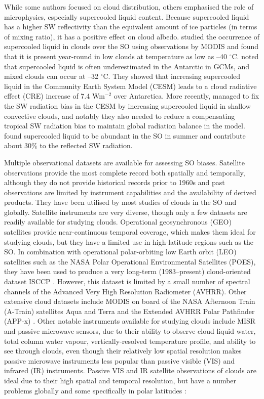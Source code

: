 While some authors focused on cloud distribution, others
emphasised the role of microphysics, especially supercooled liquid content.
Because supercooled liquid has a higher SW reflectivity than the equivalent amount
of ice particles (in terms of mixing ratio), it has a positive effect on cloud albedo.
\cite{morrison2011} studied the occurrence of supercooled liquid in clouds
over the SO using observations by MODIS and
found that it is present year-round in low clouds at temperature as low as
--40 $^{\circ}$C.
\cite{lawson2014} noted that supercooled liquid is often
underestimated in the Antarctic in GCMs, and mixed clouds can occur at
--32 $^{\circ}$C.
They showed that increasing supercooled liquid in the
Community Earth System Model (CESM) leads to a cloud radiative effect (CRE)
increase of 7.4 Wm$^{-2}$ over Antarctica. More recently, \cite{kay2016}
managed to fix the SW radiation bias in the CESM by increasing supercooled liquid
in shallow convective clouds, and notably they also needed to reduce a
compensating tropical SW radiation bias to maintain global radiation balance
in the model.
\cite{bodas-salcedo2016} found supercooled liquid to be abundant in
the SO in summer and contribute about 30\% to the reflected
SW radiation.

Multiple observational datasets are available for assessing SO biases.
Satellite observations provide the most complete record both spatially and
temporally, although they do not provide historical records prior to
1960s and past observations are limited by instrument capabilities and
the availability of derived products. They have been utilised by most studies
of clouds in the SO and globally. Satellite instruments are very diverse, though only a few
datasets are readily available for studying clouds.
Operational geosynchronous (GEO) satellites provide near-continuous temporal
coverage,
which makes them ideal for studying clouds, but they have a limited use in
high-latitude regions such as the SO. In combination with operational polar-orbiting
low Earth orbit (LEO) satellites such as the NASA
Polar Operational Environmental Satellites (POES),
they have been used to produce a very long-term (1983--present) cloud-oriented
dataset ISCCP
\citep{schiffer1983}. However, this dataset is limited by
a small number of spectral channels of the Advanced Very High Resolution Radiometer
(AVHRR). Other extensive
cloud datasets include MODIS
on board of the NASA Afternoon Train (A-Train) satellites Aqua and Terra
and the Extended AVHRR Polar Pathfinder (APP-x) \citep{meier1997}. Other notable instruments available
for studying clouds include MISR
and passive
microwave sensors, due to their ability to observe cloud liquid water,
total column water vapour, vertically-resolved temperature profile, and
ability to see through clouds, even though their relatively low spatial
resolution makes passive microwave instruments less popular than passive visible (VIS) and infrared (IR)
instruments.
Passive VIS and IR satellite observations of clouds are ideal due to their high
spatial and temporal resolution, but have a number problems globally and some
specifically in polar latitudes \citep{bromwich2012}:


